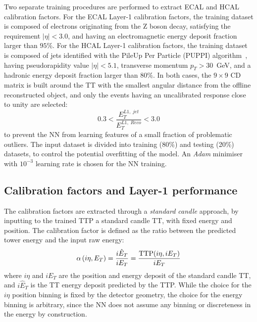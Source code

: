 Two separate training procedures are performed to extract ECAL and HCAL calibration factors. For the ECAL Layer-1 calibration factors, the training dataset is composed of electrons originating from the Z boson decay, satisfying the requirement $|\eta| < 3.0$, and having an electromagnetic energy deposit fraction larger than $95\%$.
For the HCAL Layer-1 calibration factors, the training dataset is composed of jets identified with the PileUp Per Particle (PUPPI) algorithm~\cite{PUPPI_2014}, having pseudorapidity value $|\eta| < 5.1$, transverse momentum $p_T>30$~GeV, and a hadronic energy deposit fraction larger than $80\%$.
In both cases, the $9\times9$ CD matrix is built around the TT with the smallest angular distance from the offline reconstructed object, and only the events having an uncalibrated response close to unity are selected:
\begin{equation}
    0.3 < \frac{E_T^{L1,\;jet}}{E_T^{L1,\;Reco}} < 3.0
\end{equation}
to prevent the NN from learning features of a small fraction of problematic outliers.
The input dataset is divided into training (80\%) and testing (20\%) datasets, to control the potential overfitting of the model.
An \textit{Adam} minimiser~\cite{ADAM_2017} with $10^{-3}$ learning rate is chosen for the NN training.


\subsection{Calibration factors and Layer-1 performance}

The calibration factors are extracted through a \textit{standard candle} approach, by inputting to the trained TTP a standard candle TT, with fixed energy and position. The calibration factor is defined as the ratio between the predicted tower energy and the input raw energy:
\begin{equation}
    \alpha\,(i\eta,E_{T}) = \frac{i\hat{E}_T}{iE_T} = \frac{\textnormal{TTP}(i\eta,iE_T)}{iE_T}
\end{equation}
where $i\eta$ and $iE_T$ are the position and energy deposit of the standard candle TT, and $i\hat{E}_T$ is the TT energy deposit predicted by the TTP.
While the choice for the $i\eta$ position binning is fixed by the detector geometry, the choice for the energy binning is arbitrary, since the NN does not assume any binning or discreteness in the energy by construction. 

